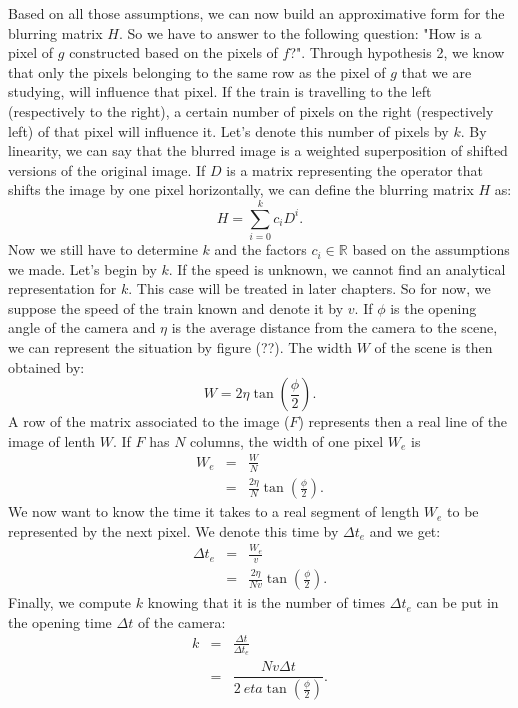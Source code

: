 Based on all those assumptions, we can now build an approximative form for the blurring matrix $H$. So we have to answer to the following question: "How is a pixel of $g$ constructed based on the pixels of $f$?". Through hypothesis 2, we know that only the pixels belonging to the same row as the pixel of $g$ that we are studying, will influence that pixel. If the train is travelling to the left (respectively to the right), a certain number of pixels on the right (respectively left) of that pixel will influence it. Let's denote this number of pixels by $k$. By linearity, we can say that the blurred image is a weighted superposition of shifted versions of the original image. If $D$ is a matrix representing the operator that shifts the image by one pixel horizontally, we can define the blurring matrix $H$ as:
\begin{equation}
H=\sum_{i=0}^{k} c_i D^{i}.
\end{equation}
Now we still have to determine $k$ and the factors $c_i \in \mathbb{R}$ based on the assumptions we made. Let's begin by $k$. If the speed is unknown, we cannot find an analytical representation for $k$. This case will be treated in later chapters. So for now, we suppose the speed of the train known and denote it by $v$. If $\phi$ is the opening angle of the camera and $\eta$ is the average distance from the camera to the scene, we can represent the situation by figure (??). The width $W$ of the scene is then obtained by: %
\begin{equation}
W = 2 \eta \tan\left(\frac{\phi}{2}\right).
\end{equation}
A row of the matrix associated to the image ($F$) represents then a real line of the image of lenth $W$. If $F$ has $N$ columns, the width of one pixel $W_e$ is
\begin{eqnarray}
W_e &=& \frac{W}{N} \\
&=& \frac{2 \eta }{N}\tan\left(\frac{\phi}{2}\right).
\end{eqnarray}
We now want to know the time it takes to a real segment of length $W_e$ to be represented by the next pixel. We denote this time by $\Delta t_e$ and we get:
\begin{eqnarray}
\Delta t_e &=&\frac{W_e}{v}\\
&=& \frac{2 \eta }{Nv}\tan\left(\frac{\phi}{2}\right).
\end{eqnarray}
Finally, we compute $k$ knowing that it is the number of times $\Delta t_e$ can be put in the opening time $\Delta t$ of the camera:
\begin{eqnarray}
k &=& \frac{\Delta t}{\Delta t _e} \\
&=& \dfrac{Nv\Delta t}{2 \ eta \tan\left(\frac{\phi}{2}\right)}.
\end{eqnarray}

